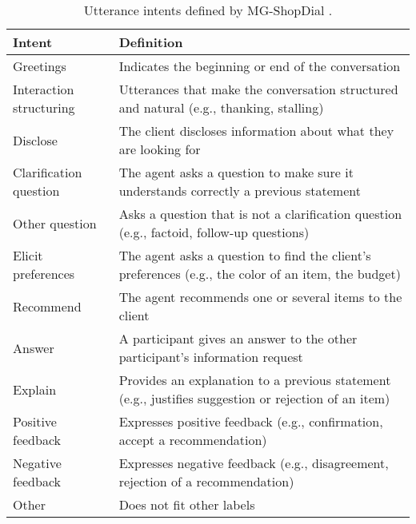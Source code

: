 \begin{table*}[t]  \small
\centering
\renewcommand{\arraystretch}{1.0} %
\begin{tabular}{ll}
\hline
\textbf{Intent} & \textbf{Definition}\\ \hline
Greetings & Indicates the beginning or end of the conversation \\ \hline
Interaction structuring & Utterances that make the conversation structured and natural (e.g., thanking, stalling) \\ \hline
Disclose & The client discloses information about what they are looking for  \\ \hline
Clarification question & The agent asks a question to make sure it understands correctly a previous statement \\ \hline
Other question & Asks a question that is not a clarification question (e.g., factoid, follow-up questions) \\ \hline
Elicit preferences & The agent asks a question to find the client’s preferences (e.g., the color of an item, the budget) \\ \hline
Recommend & The agent recommends one or several items to the client \\ \hline
Answer & A participant gives an answer to the other participant’s information request \\ \hline
Explain & Provides an explanation to a previous statement (e.g., justifies suggestion or rejection of an item) \\ \hline
Positive feedback & Expresses positive feedback (e.g., confirmation, accept a recommendation)  \\ \hline
Negative feedback & Expresses negative feedback (e.g., disagreement, rejection of a recommendation) \\ \hline
Other & Does not fit other labels \\ \hline
\end{tabular}
\caption{Utterance intents defined by MG-ShopDial \cite{Bernard:2023:SIGIR}.}
\label{tab:intent_definitions}
\end{table*}

